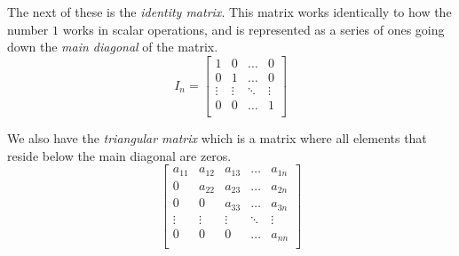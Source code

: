 The next of these is the \emph{identity matrix}. This matrix works identically
to how the number $1$ works in scalar operations, and is represented as a series
of ones going down the \emph{main diagonal} of the matrix.
\begin{equation}
    I_n = 
    \begin{bmatrix}
        1 & 0 & \ldots & 0 \\
        0 & 1 & \ldots & 0  \\
        \vdots & \vdots & \ddots & \vdots \\
        0 & 0 & \ldots & 1 \\
    \end{bmatrix}
\end{equation}

We also have the \emph{triangular matrix} which is a matrix where all elements
that reside below the main diagonal are zeros. 
\begin{equation}
    \begin{bmatrix}
        a_{11} & a_{12} & a_{13} & \ldots & a_{1n} \\
        0 & a_{22} & a_{23} & \ldots & a_{2n}  \\
        0 & 0 & a_{33} & \ldots & a_{3n}  \\
        \vdots & \vdots & \vdots & \ddots & \vdots \\
        0 & 0 & 0 & \ldots & a_{nn} \\
    \end{bmatrix}
\end{equation}
